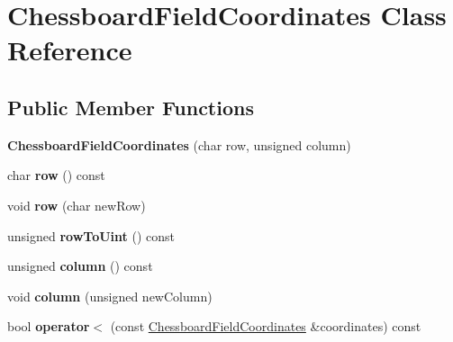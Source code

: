 \hypertarget{class_chessboard_field_coordinates}{\section{Chessboard\-Field\-Coordinates Class Reference}
\label{class_chessboard_field_coordinates}
}
\subsection*{Public Member Functions}
\begin{DoxyCompactItemize}
\item 
\hypertarget{class_chessboard_field_coordinates_ad5131c1d58de87fca63bb28ba8180b50}{{\bfseries Chessboard\-Field\-Coordinates} (char row, unsigned column)}\label{class_chessboard_field_coordinates_ad5131c1d58de87fca63bb28ba8180b50}

\item 
\hypertarget{class_chessboard_field_coordinates_a44d74852db12c7523b224437260f6a9e}{char {\bfseries row} () const }\label{class_chessboard_field_coordinates_a44d74852db12c7523b224437260f6a9e}

\item 
\hypertarget{class_chessboard_field_coordinates_a0330990dfbf7c6f222384705d8b14a50}{void {\bfseries row} (char new\-Row)}\label{class_chessboard_field_coordinates_a0330990dfbf7c6f222384705d8b14a50}

\item 
\hypertarget{class_chessboard_field_coordinates_a9b61b7017de6d3278c46c3dd1fa28a64}{unsigned {\bfseries row\-To\-Uint} () const }\label{class_chessboard_field_coordinates_a9b61b7017de6d3278c46c3dd1fa28a64}

\item 
\hypertarget{class_chessboard_field_coordinates_a0840b6856d5a491c2ed2336166224276}{unsigned {\bfseries column} () const }\label{class_chessboard_field_coordinates_a0840b6856d5a491c2ed2336166224276}

\item 
\hypertarget{class_chessboard_field_coordinates_a9f3913c89d3523464ff165ea32d3695b}{void {\bfseries column} (unsigned new\-Column)}\label{class_chessboard_field_coordinates_a9f3913c89d3523464ff165ea32d3695b}

\item 
\hypertarget{class_chessboard_field_coordinates_afedbdc9c76bb1ad98950041f125a1487}{bool {\bfseries operator$<$} (const \hyperlink{class_chessboard_field_coordinates}{Chessboard\-Field\-Coordinates} \&coordinates) const }\label{class_chessboard_field_coordinates_afedbdc9c76bb1ad98950041f125a1487}


\end{DoxyCompactItemize}
